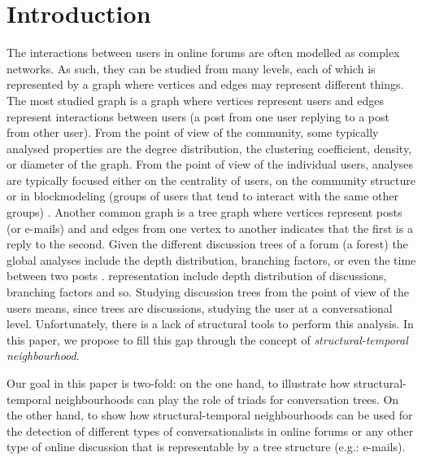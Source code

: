 \documentclass[conference]{IEEEtran}
\begin{document}
\section{Introduction}
The interactions between users in online forums are often modelled as complex networks. As such, they can be studied from many levels, each of which is represented by a graph where vertices and edges may represent different things. The most studied graph is a graph where vertices represent users and edges represent interactions between users (a post from one user replying to a post from other user). From the point of view of the community, some typically analysed properties are the degree distribution, the clustering coefficient, density, or diameter of the graph. From the point of view of the individual users, analyses are typically focused either on the centrality of users, on the community structure or in blockmodeling (groups of users that tend to interact with the same other groups) \cite{McCallum2007a}. Another common graph is a tree graph where vertices represent posts (or e-mails) and and edges from one vertex to another indicates that the first is a reply to the second. Given the different discussion trees of a forum (a forest) the global analyses include the depth distribution, branching factors, or even the time between two posts \cite{Bhatt2012}. representation include depth distribution of discussions, branching factors and so. Studying discussion trees from the point of view of the users means, since trees are discussions, studying the user at a conversational level. Unfortunately, there is a lack of structural tools to perform this analysis. In this paper, we propose to fill this gap through the concept of \textit{structural-temporal neighbourhood}.  

Our goal in this paper is two-fold: on the one hand, to illustrate how structural-temporal neighbourhoods can play the role of triads for conversation trees. On the other hand, to show how structural-temporal neighbourhoods can be used for the detection of different types of conversationalists in online forums or any other type of online discussion that is representable by a tree structure (e.g.: e-mails).

\end{document}
